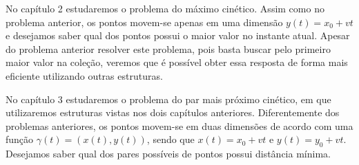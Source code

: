 No capítulo 2 estudaremos o problema do máximo cinético. Assim como no problema
anterior, os pontos movem-se apenas em uma dimensão $y(t) = x_0 + vt$ e
desejamos saber qual dos pontos possui o maior valor no instante atual. Apesar
do problema anterior resolver este problema, pois basta buscar pelo primeiro
maior valor na coleção, veremos que é possível obter essa resposta de forma mais
eficiente utilizando outras estruturas.

No capítulo 3 estudaremos o problema do par mais próximo cinético, em que
utilizaremos estruturas vistas nos dois capítulos anteriores. Diferentemente dos
problemas anteriores, os pontos movem-se em duas dimensões de acordo com uma
função $\gamma(t) = (x(t), y(t))$, sendo que $x(t) = x_0 + vt$ e $y(t) = y_0 +
vt$. Desejamos saber qual dos pares possíveis de pontos possui distância mínima.


